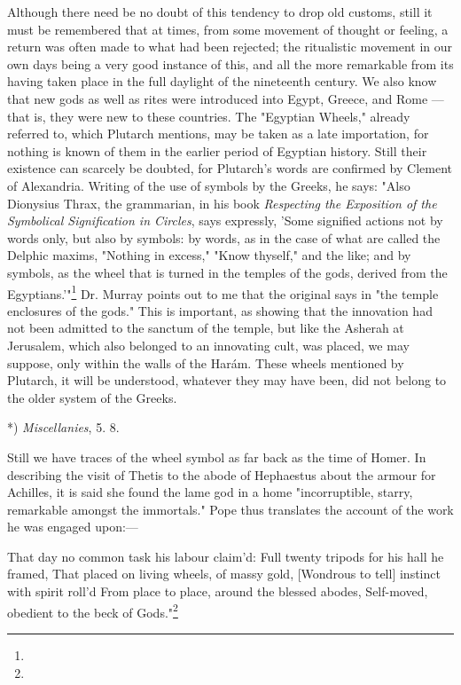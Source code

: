\documentclass[a4paper, 11pt, oneside, polutonikogreek, english]{article}
\begin{document}
Although there need be no doubt of this tendency to drop old customs, still it must be remembered that at times, from some movement of thought or feeling, a return was often made to what had been rejected; the ritualistic movement in our own days being a very good instance of this, and all the more remarkable from its having taken place in the full daylight of the nineteenth century. We also know that new gods as well as rites were introduced into Egypt, Greece, and Rome --- that is, they were new to these countries. The "Egyptian Wheels," already referred to, which Plutarch mentions, may be taken as a late importation, for nothing is known of them in the earlier period of Egyptian history. Still their existence can scarcely be doubted, for Plutarch's words are confirmed by Clement of Alexandria. Writing of the use of symbols by the Greeks, he says: "Also Dionysius Thrax, the grammarian, in his book \emph{Respecting the Exposition of the Symbolical Signification in Circles}, says expressly, 'Some signified actions not by words only, but also by symbols: by words, as in the case of what are called the Delphic maxims, "Nothing in excess," "Know thyself," and the like; and by symbols, as the wheel that is turned in the temples of the gods, derived from the Egyptians.'"\footnote{} Dr. Murray points out to me that the original says in "the temple enclosures of the gods." This is important, as showing that the innovation had not been admitted to the sanctum of the temple, but like the Asherah at Jerusalem, which also belonged to an innovating cult, was placed, we may suppose, only within the walls of the Harám. These wheels mentioned by Plutarch, it will be understood, whatever they may have been, did not belong to the older system of the Greeks.

*) \emph{Miscellanies}, 5. 8.

Still we have traces of the wheel symbol as far back as the time of Homer. In describing the visit of Thetis to the abode of Hephaestus about the armour for Achilles, it is said she found the lame god in a home "incorruptible, starry, remarkable amongst the immortals." Pope thus translates the account of the work he was engaged upon:---

That day no common task his labour claim'd:  
Full twenty tripods for his hall he framed,  
That placed on living wheels, of massy gold,  
[Wondrous to tell] instinct with spirit roll'd  
From place to place, around the blessed abodes,  
Self-moved, obedient to the beck of Gods."\footnote{}
\end{document}
